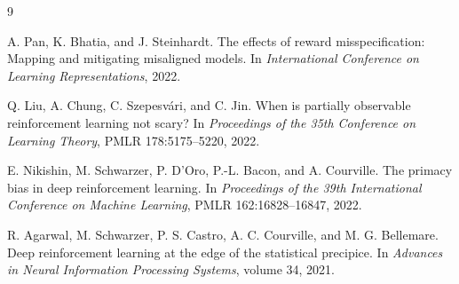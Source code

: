 \documentclass[9pt,twocolumn]{extarticle}
\begin{document}
\begin{thebibliography}{9}
\small

A. Pan, K. Bhatia, and J. Steinhardt.
\newblock The effects of reward misspecification: Mapping and mitigating
misaligned models.
\newblock In \emph{International Conference on Learning Representations},
2022.

Q. Liu, A. Chung, C. Szepesv\'ari, and C. Jin.
\newblock When is partially observable reinforcement learning not scary?
\newblock In \emph{Proceedings of the 35th Conference on Learning Theory},
PMLR 178:5175--5220, 2022.

E. Nikishin, M. Schwarzer, P. D'Oro, P.-L. Bacon, and A. Courville.
\newblock The primacy bias in deep reinforcement learning.
\newblock In \emph{Proceedings of the 39th International Conference on Machine
Learning}, PMLR 162:16828--16847, 2022.

R. Agarwal, M. Schwarzer, P. S. Castro, A. C. Courville, and M. G. Bellemare.
\newblock Deep reinforcement learning at the edge of the statistical
precipice.
\newblock In \emph{Advances in Neural Information Processing Systems},
volume 34, 2021.

\end{thebibliography}
\end{document}
